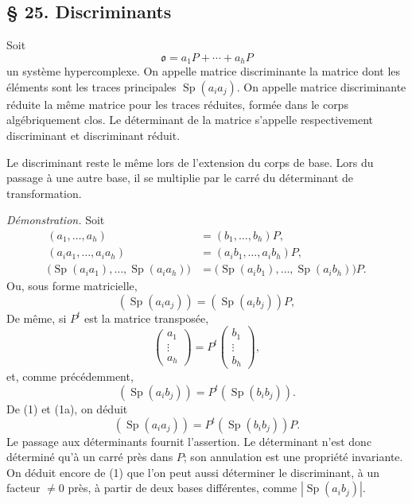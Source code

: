 
\providecommand{\mo}{\mathfrak{o}}
\providecommand{\mc}{\mathfrak{c}}
\providecommand{\ma}{\mathfrak{a}}

\subsection*{\S{} 25. Discriminants}
Soit
\[
        \mo=a_1P+\cdots+a_hP
\]
un système hypercomplexe. On appelle matrice discriminante la matrice dont les éléments sont les traces principales $\operatorname{Sp}(a_i a_j)$. On appelle matrice discriminante réduite la même matrice pour les traces réduites, formée dans le corps algébriquement clos. Le déterminant de la matrice s'appelle respectivement discriminant et discriminant réduit.

Le discriminant reste le même lors de l'extension du corps de base. Lors du passage à une autre base, il se multiplie par le carré du déterminant de transformation.

\emph{Démonstration.} Soit
\begin{align*}
(a_1,\ldots,a_h)&=(b_1,\ldots,b_h)P,\\
(a_i a_1,\ldots,a_i a_h)&=(a_i b_1,\ldots,a_i b_h)P,\\
\bigl(\operatorname{Sp}(a_i a_1),\ldots,\operatorname{Sp}(a_i a_h)\bigr)
&=\bigl(\operatorname{Sp}(a_i b_1),\ldots,\operatorname{Sp}(a_i b_h)\bigr)P.
\end{align*}
Ou, sous forme matricielle,
\[
        (\operatorname{Sp}(a_i a_j))=(\operatorname{Sp}(a_i b_j))P,             \tag{1}
\]
De même, si $P^t$ est la matrice transposée,
\[
\begin{pmatrix}a_1\\[-1mm]\vdots\\[-1mm]a_h\end{pmatrix}
=P^t
\begin{pmatrix}b_1\\[-1mm]\vdots\\[-1mm]b_h\end{pmatrix},
\]
et, comme précédemment,
\[
        (\operatorname{Sp}(a_i b_j))=P^t(\operatorname{Sp}(b_i b_j)).           \tag{1a}
\]
De (1) et (1a), on déduit
\[
        (\operatorname{Sp}(a_i a_j))=P^t(\operatorname{Sp}(b_i b_j))P.
\]
Le passage aux déterminants fournit l'assertion. Le déterminant n'est donc déterminé qu'à un carré près dans $P$; son annulation est une propriété invariante. On déduit encore de (1) que l'on peut aussi déterminer le discriminant, à un facteur $\ne0$ près, à partir de deux bases différentes, comme $|\operatorname{Sp}(a_i b_j)|$.

